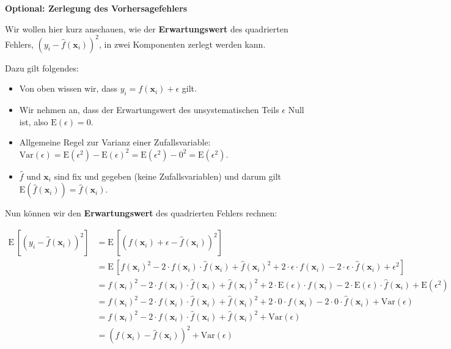 \documentclass[
]{book}
\providecommand{\tightlist}{%
  \setlength{\itemsep}{0pt}\setlength{\parskip}{0pt}}
\begin{document}
\textbf{Optional: Zerlegung des Vorhersagefehlers}

Wir wollen hier kurz anschauen, wie der \textbf{Erwartungswert} des quadrierten Fehlers, \(\left(y_i - \hat{f}(\mathbf{x}_i)\right)^2\), in zwei Komponenten zerlegt werden kann.

Dazu gilt folgendes:

\begin{itemize}
\tightlist
\item
  Von oben wissen wir, dass \(y_i = f(\mathbf{x}_i) + \epsilon\) gilt.
\item
  Wir nehmen an, dass der Erwartungswert des unsystematischen Teils \(\epsilon\) Null ist, also \(\text{E}(\epsilon)=0\).
\item
  Allgemeine Regel zur Varianz einer Zufallsvariable: \(\text{Var}(\epsilon) = \text{E}(\epsilon^2) - \text{E}(\epsilon)^2 = \text{E}(\epsilon^2) - 0^2 = \text{E}(\epsilon^2)\).
\item
  \(\hat{f}\) und \(\mathbf{x}_i\) sind fix und gegeben (keine Zufallsvariablen) und darum gilt \(\text{E}\left(\hat{f}(\mathbf{x}_i)\right)=\hat{f}(\mathbf{x}_i)\).
\end{itemize}

Nun können wir den \textbf{Erwartungswert} des quadrierten Fehlers rechnen:

\begin{align}
\text{E}\,\left[\left(y_i - \hat{f}(\mathbf{x}_i)\right)^2\right] &= \text{E}\,\left[\left(f(\mathbf{x}_i) + \epsilon - \hat{f}(\mathbf{x}_i)\right)^2\right] \\
&= \text{E}\,\left[f(\mathbf{x}_i)^2 - 2 \cdot f(\mathbf{x}_i) \cdot \hat{f}(\mathbf{x}_i) + \hat{f}(\mathbf{x}_i)^2 + 2 \cdot \epsilon \cdot f(\mathbf{x}_i) - 2 \cdot \epsilon \cdot \hat{f}(\mathbf{x}_i) + \epsilon^2 \right] \\
&= f(\mathbf{x}_i)^2 - 2 \cdot f(\mathbf{x}_i) \cdot \hat{f}(\mathbf{x}_i) + \hat{f}(\mathbf{x}_i)^2 + 2 \cdot \text{E}(\epsilon) \cdot f(\mathbf{x}_i) - 2 \cdot \text{E}(\epsilon) \cdot \hat{f}(\mathbf{x}_i) + \text{E}(\epsilon^2) \\
&= f(\mathbf{x}_i)^2 - 2 \cdot f(\mathbf{x}_i) \cdot \hat{f}(\mathbf{x}_i) + \hat{f}(\mathbf{x}_i)^2 + 2 \cdot 0 \cdot f(\mathbf{x}_i) - 2 \cdot 0 \cdot \hat{f}(\mathbf{x}_i) + \text{Var}(\epsilon) \\
&= f(\mathbf{x}_i)^2 - 2 \cdot f(\mathbf{x}_i) \cdot \hat{f}(\mathbf{x}_i) + \hat{f}(\mathbf{x}_i)^2 + \text{Var}(\epsilon) \\
&= \left(f(\mathbf{x}_i) - \hat{f}(\mathbf{x}_i)\right)^2 + \text{Var}(\epsilon)
\end{align}
\end{document}
